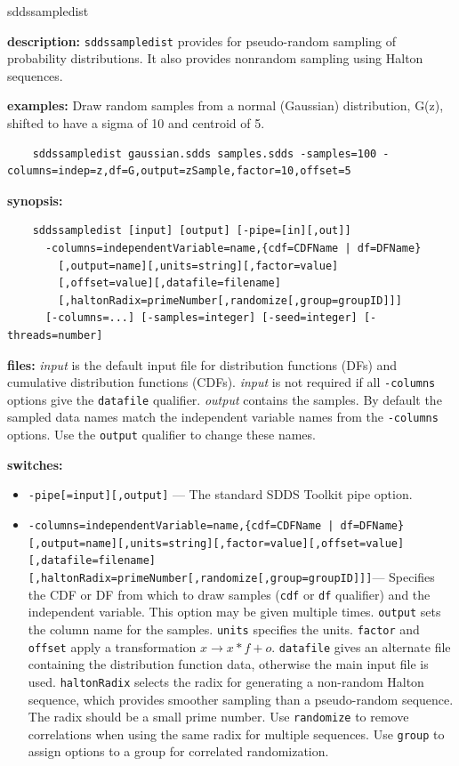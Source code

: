\begin{sddsprog}{sddssampledist}
  \item \textbf{description:} \verb|sddssampledist| provides for pseudo-random sampling of probability distributions. It also provides nonrandom sampling using Halton sequences.
  \item \textbf{examples:} Draw random samples from a normal (Gaussian) distribution, G(z), shifted to have a sigma of 10 and centroid of 5.
    \begin{verbatim}
    sddssampledist gaussian.sdds samples.sdds -samples=100 -columns=indep=z,df=G,output=zSample,factor=10,offset=5
    \end{verbatim}
  \item \textbf{synopsis:}
    \begin{verbatim}
    sddssampledist [input] [output] [-pipe=[in][,out]]
      -columns=independentVariable=name,{cdf=CDFName | df=DFName}
        [,output=name][,units=string][,factor=value]
        [,offset=value][,datafile=filename]
        [,haltonRadix=primeNumber[,randomize[,group=groupID]]]
      [-columns=...] [-samples=integer] [-seed=integer] [-threads=number]
    \end{verbatim}
  \item \textbf{files:}
    \emph{input} is the default input file for distribution functions (DFs) and cumulative distribution functions (CDFs). \emph{input} is not required if all \verb|-columns| options give the \verb|datafile| qualifier.
    \emph{output} contains the samples. By default the sampled data names match the independent variable names from the \verb|-columns| options. Use the \verb|output| qualifier to change these names.
  \item \textbf{switches:}
    \begin{itemize}
      \item \verb|-pipe[=input][,output]| --- The standard SDDS Toolkit pipe option.
      \item \verb!-columns=independentVariable=name,{cdf=CDFName | df=DFName}[,output=name][,units=string][,factor=value][,offset=value][,datafile=filename][,haltonRadix=primeNumber[,randomize[,group=groupID]]]!--- Specifies the CDF or DF from which to draw samples (\verb|cdf| or \verb|df| qualifier) and the independent variable. This option may be given multiple times. \verb|output| sets the column name for the samples. \verb|units| specifies the units. \verb|factor| and \verb|offset| apply a transformation $x \rightarrow x*f+o$. \verb|datafile| gives an alternate file containing the distribution function data, otherwise the main input file is used. \verb|haltonRadix| selects the radix for generating a non-random Halton sequence, which provides smoother sampling than a pseudo-random sequence. The radix should be a small prime number. Use \verb|randomize| to remove correlations when using the same radix for multiple sequences. Use \verb|group| to assign options to a group for correlated randomization.

\end{itemize}
\end{sddsprog}
